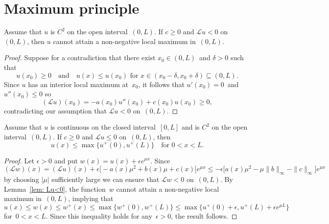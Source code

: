 \section{Maximum principle}

\begin{lemma}\label{lem: Lu<0}
Assume that $u$ is $C^2$ on the open interval~$(0,L)$.
If $c\ge0$ and $\mathcal{L}u<0$ on~$(0,L)$, then $u$ cannot attain a 
non-negative local maximum in~$(0,L)$.
\end{lemma}
\begin{proof}
Suppose for a contradiction that there exist $x_0\in(0,L)$~and $\delta>0$ such
that
\[
u(x_0)\ge0\quad\text{and}\quad
\text{$u(x)\le u(x_0)$ for~$x\in(x_0-\delta,x_0+\delta)\subseteq(0,L)$.}
\]
Since $u$ has an interior local maximum at~$x_0$, it follows that 
$u'(x_0)=0$~and $u''(x_0)\le0$ so 
\[
(\mathcal{L}u)(x_0)=-a(x_0)u''(x_0)+c(x_0)u(x_0)\ge 0,
\]
contradicting our assumption that $\mathcal{L}u<0$ on~$(0,L)$.
\end{proof}

\begin{theorem}
Assume that $u$ is continuous on the closed interval~$[0,L]$ and is $C^2$ on 
the open interval~$(0,L)$. If $c\ge0$ and $\mathcal{L}u\le0$ on~$(0,L)$, then
\[
u(x)\le\max\{u^+(0),u^+(L)\}\quad\text{for $0<x<L$.}
\]
\end{theorem}
\begin{proof}
Let $\epsilon>0$ and put $w(x)=u(x)+\epsilon e^{\mu x}$.  Since
\[
(\mathcal{L}w)(x)
	=(\mathcal{L}u)(x)+\epsilon\bigl[-a(x)\mu^2+b(x)\mu+c(x)\bigr]e^{\mu x}
	\le-\epsilon\bigl[a(x)\mu^2-\mu\|b\|_\infty-\|c\|_\infty\bigr]e^{\mu x}
\]
by choosing $|\mu|$ sufficiently large we can ensure that $\mathcal{L}w<0$
on~$(0,L)$.  By Lemma~\ref{lem: Lu<0}, the function~$w$ cannot attain a 
non-negative local maximum in~$(0,L)$, implying that 
\[
u(x)\le w(x)\le w^+(x)\le\max\{w^+(0),w^+(L)\}
	\le\max\{u^+(0)+\epsilon,u^+(L)+\epsilon e^{\mu L}\}
\]
for~$0<x<L$.  Since this inequality holds for any~$\epsilon>0$, the result 
follows.
\end{proof}

